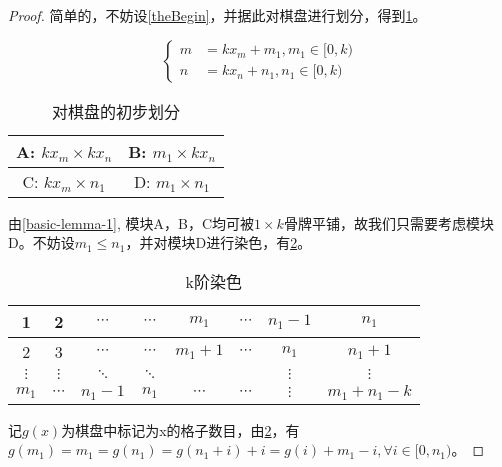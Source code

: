 \begin{proof}
    简单的，不妨设\ref*{theBegin}，并据此对棋盘进行划分，得到\ref*{fig:first-picture}。

    $$
        \left\{
        \begin{aligned}
            m & =  kx_m + m_1, m_1 \in [0, k) \\
            n & =  kx_n + n_1, n_1 \in [0, k)
            \label{theBegin}
        \end{aligned}
        \right.
    $$

    \begin{table}[h]
        \centering
        \caption{对棋盘的初步划分}
        \begin{tabular}{|c|c|}
            \hline
            A: $kx_m \times kx_n$ & B: $m_1 \times kx_n$ \\
            \hline
            C: $kx_m \times n_1$  & D: $m_1 \times n_1$  \\
            \hline
        \end{tabular}
        \label{fig:first-picture}
    \end{table}

    由\ref*{basic-lemma-1}, 模块A，B，C均可被$1 \times k$骨牌平铺，故我们只需要考虑模块D。不妨设$m_1 \le n_1$，并对模块D进行染色，有\ref*{fig:k-order-staining-example}。

    \begin{table}[ht]
        \centering
        \caption{k阶染色}
        \begin{tabular}{|c|c|c|c|c|c|c|c|}
            \hline
            1        & 2        & $\cdots$ & $\cdots$ & $m_1$     & $\cdots$ & $n_1 - 1$ & $n_1$          \\
            \hline
            2        & 3        & $\cdots$ & $\cdots$ & $m_1 + 1$ & $\cdots$ & $n_1$     & $n_1 + 1$      \\
            \hline
            $\vdots$ & $\vdots$ & $\ddots$ & $\ddots$ &           &          & $\vdots$  & $\vdots$       \\
            \hline
            $m_1$    & $\cdots$ & $n_1-1$  & $n_1$    & $\cdots$  & $\cdots$ & $\vdots$  & $m_1 + n_1 -k$ \\
            \hline
        \end{tabular}
        \label{fig:k-order-staining-example}
    \end{table}


    记$g(x)$为棋盘中标记为x的格子数目，由\ref*{fig:k-order-staining-example}，有$g(m_1) = m_1 = g(n_1) = g(n_1 + i) + i = g(i) + m_1 - i, \forall i \in [0, n_1)$。


\end{proof}
